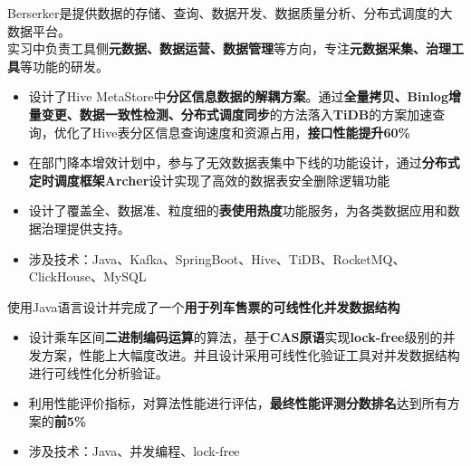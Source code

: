 \documentclass{resume}
\begin{document}
Berserker是提供数据的存储、查询、数据开发、数据质量分析、分布式调度的大数据平台。\\
实习中负责工具侧\textbf{元数据、数据运营、数据管理}等方向，专注\textbf{元数据采集、治理工具}等功能的研发。
\begin{itemize}
  \item 设计了Hive MetaStore中\textbf{分区信息数据的解耦方案}。通过\textbf{全量拷贝、Binlog增量变更、数据一致性检测、分布式调度同步}的方法落入\textbf{TiDB}的方案加速查询，优化了Hive表分区信息查询速度和资源占用，\textbf{接口性能提升60\%}
  \item 在部门降本增效计划中，参与了无效数据表集中下线的功能设计，通过\textbf{分布式定时调度框架Archer}设计实现了高效的数据表安全删除逻辑功能
  \item 设计了覆盖全、数据准、粒度细的\textbf{表使用热度}功能服务，为各类数据应用和数据治理提供支持。
  \item 涉及技术：Java、Kafka、SpringBoot、Hive、TiDB、RocketMQ、ClickHouse、MySQL
\end{itemize}

\begin{onehalfspacing}
  使用Java语言设计并完成了一个\textbf{用于列车售票的可线性化并发数据结构}
\begin{itemize}
  \item 设计乘车区间\textbf{二进制编码运算}的算法，基于\textbf{CAS原语}实现\textbf{lock-free}级别的并发方案，性能上大幅度改进。并且设计采用可线性化验证工具对并发数据结构进行可线性化分析验证。
  \item 利用性能评价指标，对算法性能进行评估，\textbf{最终性能评测分数排名}达到所有方案的\textbf{前5\%}
  \item 涉及技术：Java、并发编程、lock-free
\end{itemize}
\end{onehalfspacing}

\end{document}
